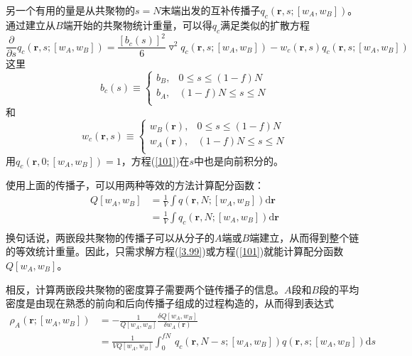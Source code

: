另一个有用的量是从共聚物的$s=N$末端出发的互补传播子$q_c(\mathbf{r},s;[w_A,w_B])$。通过建立从$B$端开始的共聚物统计重量，可以得$q_c$满足类似的扩散方程
\begin{equation}
\frac{\partial}{\partial s}q_c(\mathbf{r},s;[w_A,w_B])=\frac{[b_c(s)]^2}{6}\triangledown ^2q_c(\mathbf{r},s;[w_A,w_B])-w_c(\mathbf{r},s)q_c(\mathbf{r},s;[w_A,w_B]) \label{101}
\end{equation}
这里
\begin{equation}
b_c (s)\equiv
\begin{cases}
b_B, & 0\leq s \leq (1-f)N \\
b_A, & (1-f)N \leq s \leq N\\
\end{cases}
\end{equation}
和
\begin{equation}
w_c (\mathbf{r},s)\equiv
\begin{cases}
w_B(\mathbf{r}), & 0\leq s \leq (1-f)N \\
w_A(\mathbf{r}), & (1-f)N \leq s \leq N\\
\end{cases}
\end{equation}
用$q_c(\mathbf{r},0;[w_A,w_B])=1$，方程(\ref{101})在$s$中也是向前积分的。		

使用上面的传播子，可以用两种等效的方法计算配分函数：
\begin{equation}
\begin{aligned}
Q[w_A,w_B] & = \frac{1}{V}\int q(\mathbf{r},N;[w_A,w_B]) \mathrm{d}\mathbf{r} \\
&=\frac{1}{V}\int q_c(\mathbf{r},N;[w_A,w_B]) \mathrm{d}\mathbf{r} \\
\end{aligned}	
\end{equation}
换句话说，两嵌段共聚物的传播子可以从分子的$A$端或$B$端建立，从而得到整个链的等效统计重量。因此，只需求解方程(\ref{3.99})或方程(\ref{101})就能计算配分函数$Q[w_A,w_B]$。

相反，计算两嵌段共聚物的密度算子需要两个链传播子的信息。$A$段和$B$段的平均密度是由现在熟悉的前向和后向传播子组成的过程构造的，从而得到表达式
\begin{equation}
\begin{aligned}
\rho _A(\mathbf{r};[w_A,w_B]) & =-\frac{1}{Q[w_A,w_B]}	\frac{\delta Q[w_A,w_B]}{\delta w_A(\mathbf{r})} \\
& =\frac{1}{VQ[w_A,w_B]} \int _{0}^{fN}\,q_c(\mathbf{r},N-s;[w_A,w_B])q(\mathbf{r},s;[w_A,w_B]) \mathrm{d}s~ \\
\end{aligned}	
\end{equation}

